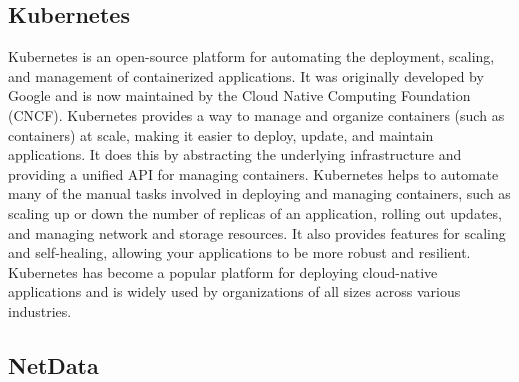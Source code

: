   \subsection{Kubernetes}
  \label{sec:kubernetes-third-party}
    Kubernetes \cite{the-linux-foundationKubernetesDocumentationGetting} is an open-source platform for automating the deployment, scaling, and management of containerized applications. It was originally developed by Google and is now maintained by the Cloud Native Computing Foundation (CNCF).
    Kubernetes provides a way to manage and organize containers (such as  containers) at scale, making it easier to deploy, update, and maintain applications. It does this by abstracting the underlying infrastructure and providing a unified API for managing containers.
    Kubernetes helps to automate many of the manual tasks involved in deploying and managing containers, such as scaling up or down the number of replicas of an application, rolling out updates, and managing network and storage resources. It also provides features for scaling and self-healing, allowing your applications to be more robust and resilient.
    Kubernetes has become a popular platform for deploying cloud-native applications and is widely used by organizations of all sizes across various industries.

    \subsection{NetData}
    \label{sec:netdata-third-party}

